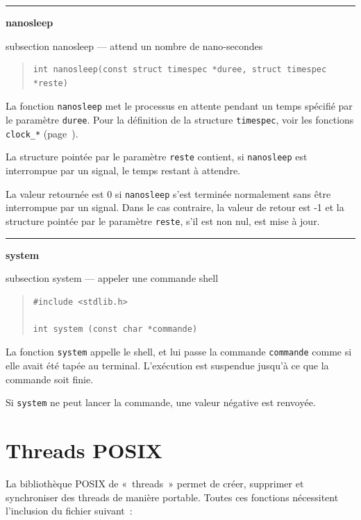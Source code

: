 \documentclass [twoside] {report}
\newcommand {\primitive} [1]
    {
	\phantomsection
	{\large \textbf {#1}}
	\addcontentsline {toc} {subsection} {#1}
    }
\newcommand {\separation}
    {
	\vspace {5mm}
	\nopagebreak
	\hrule
    }
\begin{document}
\separation 
\primitive {nanosleep} --- attend un nombre de nano-secondes

\begin {quote}
\begin {verbatim}
int nanosleep(const struct timespec *duree, struct timespec *reste)
\end{verbatim}
\end {quote}

La fonction \texttt {nanosleep} met le processus en attente pendant un
temps spécifié par le paramètre \texttt {duree}. Pour la définition de
la structure \texttt {timespec}, voir les fonctions \texttt {clock\_*}
(page~\pageref {clockgettime}).  

La structure pointée par le paramètre \texttt {reste} contient, si
\texttt {nanosleep} est interrompue par un signal, le temps restant
à attendre.

La valeur retournée est 0 si \texttt {nanosleep} s'est terminée normalement
sans être interrompue par un signal. Dans le cas contraire, la valeur de
retour est -1 et la structure pointée par le paramètre \texttt {reste},
s'il est non nul, est mise à jour.


\separation 
\primitive {system} --- appeler une commande shell

\begin {quote}
\begin {verbatim}
#include <stdlib.h>

int system (const char *commande)
\end{verbatim}
\end {quote}

La fonction \texttt {system} appelle le shell, et lui passe la
commande \texttt {commande} comme si elle avait été tapée au
terminal. L'exécution est suspendue jusqu'à ce que la
commande soit finie.

Si \texttt {system} ne peut lancer la commande, une valeur
négative est renvoyée.




\cleardoublepage
\chapter {Threads POSIX}

La bibliothèque POSIX de «~threads~» permet de créer, supprimer et
synchroniser des threads de manière portable. Toutes ces fonctions
nécessitent l'inclusion du fichier suivant~:
\end{document}
